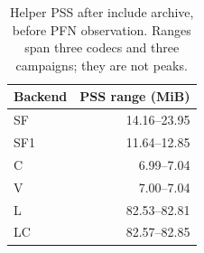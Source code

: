 \begin{table}[t]\centering\small
\caption{Helper PSS after include archive, before PFN observation. Ranges span three codecs and three campaigns; they are not peaks.}
\label{tab:filesystem-resources}
\begin{tabular}{lr}\toprule Backend & PSS range (MiB) \\\midrule
SF & 14.16--23.95 \\
SF1 & 11.64--12.85 \\
C & 6.99--7.04 \\
V & 7.00--7.04 \\
L & 82.53--82.81 \\
LC & 82.57--82.85 \\
\bottomrule\end{tabular}\end{table}
